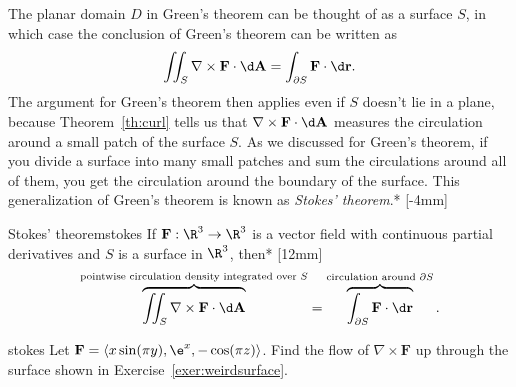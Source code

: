 \documentclass{watsonbook}
\begin{document}
The planar domain $D$ in Green's theorem can be thought of as a
surface $S$, in which case the conclusion of Green's theorem can be
written as
\[
  \iint_S \nabla \times \mathbf{F} \cdot
  \d\mathbf{A} =
  \int_{\partial S} \mathbf{F} \cdot
  \d\mathbf{r}. 
\]
The argument for Green's theorem then applies even if $S$ doesn't lie
in a plane, because Theorem~\ref{th:curl} tells us that
$\nabla \times \mathbf{F} \cdot \d\mathbf{A}$ measures the circulation
around a small patch of the surface $S$. As we discussed for Green's
theorem, if you divide a surface into many small patches and sum the
circulations around all of them, you get the circulation around the
boundary of the surface.  This generalization of Green's theorem is
known as \textit{Stokes' theorem}.* [-4mm]

\begin{theo}{Stokes' theorem}{stokes} 
  If $\mathbf{F} : \R^3 \to \R^3$ is a vector field with continuous
  partial derivatives and $S$ is a surface in $\R^3$, then*
  [12mm]
  \[
    \overbrace{\iint_S \nabla \times \mathbf{F} \cdot
      \d\mathbf{A}}^{\text{pointwise circulation density integrated
        over $S$}} =
    \overbrace{\int_{\partial S} \mathbf{F} \cdot
      \d\mathbf{r}}^{\text{circulation around $\partial S$}}. 
  \]
\end{theo}

\begin{example}{}{stokes}
  Let $\mathbf{F} = \langle x \sin (\pi y), \e^x, -\cos(\pi z)
  \rangle$. Find the flow of $\nabla \times \mathbf{F}$ up through the
  surface shown in Exercise~\ref{exer:weirdsurface}.
\end{example}
\end{document}
